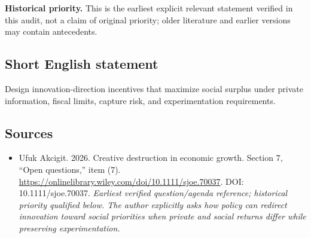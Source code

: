 \documentclass[11pt]{article}
\begin{document}
\par\textbf{Historical priority.} This is the earliest explicit relevant statement verified in this audit, not a claim of original priority; older literature and earlier versions may contain antecedents.

\subsection{Short English statement}
Design innovation-direction incentives that maximize social surplus under private information, fiscal limits, capture risk, and experimentation requirements.

\subsection{Sources}
\begin{itemize}\raggedright
\item[\textnormal{[S1]}]\hypertarget{source:30007551:1}{} Ufuk Akcigit. 2026. Creative destruction in economic growth. Section 7, “Open questions,” item (7).
\url{https://onlinelibrary.wiley.com/doi/10.1111/sjoe.70037}.
DOI: 10.1111/sjoe.70037.
{\small\textit{Earliest verified question/agenda reference; historical priority qualified below. The author explicitly asks how policy can redirect innovation toward social priorities when private and social returns differ while preserving experimentation.}}
\end{itemize}
\end{document}
